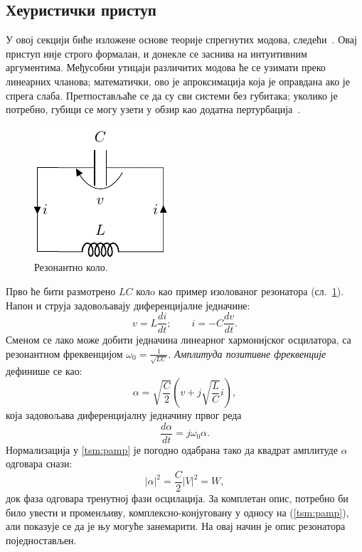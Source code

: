 \documentclass[main.tex]{subfiles}
\begin{document}
\subsection{Хеуристички приступ}

У овој секцији биће изложене основе теорије спрегнутих модова, следећи~\cite{haus}. Овај приступ није строго формалан, и донекле се заснива на интуитивним аргументима. Међусобни утицаји различитих модова ће се узимати преко линеарних чланова; математички, ово је апроксимација која је оправдана ако је спрега слаба. Претпостављаће се да су сви системи без губитака; уколико је потребно, губици се могу узети у обзир као додатна пертурбација~\cite{haus}.

\begin{figure}[h]
\centering
\includegraphics[width=0.4\linewidth]{sl_tsm/lckolo.pdf}
\caption{Резонантно коло.}
\label{tsm:fig:lckolo}
\end{figure}
Прво ће бити размотрено $LC$ колo као пример изолованог резонатора (сл.~\ref{tsm:fig:lckolo}). Напон и струја задовољавају диференцијалне једначине:
\begin{equation}
v = L \frac{d i}{d t}; \qquad i = -C \frac{d v}{d t}.
\end{equation}
Сменом се лако може добити једначина линеарног хармонијског осцилатора, са резонантном фреквенцијом $\omega_0 = \frac{1}{\sqrt{LC}}$. \emph{Амплитуда позитивне фреквенције} дефинише се као:
\begin{equation}
\alpha = \sqrt{\frac{C}{2}}\left( v + j\sqrt{\frac{L}{C}}i  \right),
\label{tsm:pamp}
\end{equation}
која задовољава диференцијалну једначину првог реда
\begin{equation}
\frac{d\alpha}{dt} = j\omega_0 \alpha.
\label{tsm:smdif1}
\end{equation}
Нормализација у \ref{tsm:pamp} је погодно одабрана тако да квадрат амплитуде $\alpha$ одговара снази:
\begin{equation}
|\alpha|^2 = \frac{C}{2}|V|^2 = W,
\end{equation}
док фаза одговара тренутној фази осцилација. За комплетан опис, потребно би било увести и променљиву, комплексно-конјуговану у односу на (\ref{tsm:pamp}), али показује се да је њу могуће занемарити. На овај начин је опис резонатора поједностављен.
\end{document}
